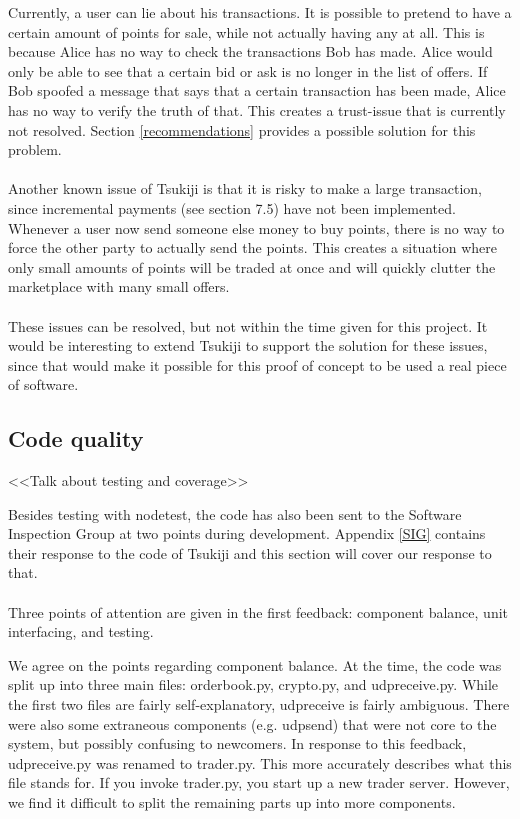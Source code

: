 Currently, a user can lie about his transactions.
It is possible to pretend to have a certain amount of points for sale, while not actually having any at all.
This is because Alice has no way to check the transactions Bob has made.
Alice would only be able to see that a certain bid or ask is no longer in the list of offers.
If Bob spoofed a message that says that a certain transaction has been made, Alice has no way to verify the truth of that.
This creates a trust-issue that is currently not resolved.
Section \ref{recommendations} provides a possible solution for this problem.\\
\\
Another known issue of Tsukiji is that it is risky to make a large transaction, since incremental payments (see section 7.5) have not been implemented.
Whenever a user now send someone else money to buy points, there is no way to force the other party to actually send the points.
This creates a situation where only small amounts of points will be traded at once and will quickly clutter the marketplace with many small offers.\\
\\
These issues can be resolved, but not within the time given for this project.
It would be interesting to extend Tsukiji to support the solution for these issues, since that would make it possible for this proof of concept to be used a real piece of software.



\subsection{Code quality}
<<Talk about testing and coverage>>

Besides testing with nodetest, the code has also been sent to the Software Inspection Group at two points during development. Appendix \ref{SIG} contains their response to the code of Tsukiji and this section will cover our response to that.\\
\\
Three points of attention are given in the first feedback: component balance, unit interfacing, and testing.

We agree on the points regarding component balance.
At the time, the code was split up into three main files: orderbook.py, crypto.py, and udpreceive.py.
While the first two files are fairly self-explanatory, udpreceive is fairly ambiguous.
There were also some extraneous components (e.g. udpsend) that were not core to the system, but possibly confusing to newcomers.
In response to this feedback, udpreceive.py was renamed to trader.py.
This more accurately describes what this file stands for.
If you invoke trader.py, you start up a new trader server.
However, we find it difficult to split the remaining parts up into more components.

